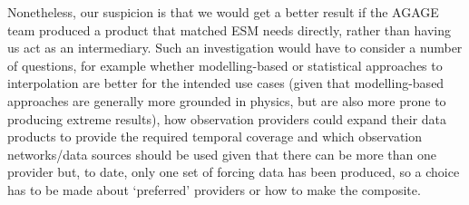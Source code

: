 Nonetheless, our suspicion is that we would get a better result if the AGAGE team produced a product that matched ESM needs directly,
rather than having us act as an intermediary.
Such an investigation would have to consider a number of questions,
for example whether modelling-based or statistical approaches to interpolation are better for the intended use cases
(given that modelling-based approaches are generally more grounded in physics, but are also more prone to producing extreme results),
how observation providers could expand their data products to provide the required temporal coverage
and which observation networks/data sources should be used given that there can be more than one provider
but, to date, only one set of forcing data has been produced,
so a choice has to be made about `preferred' providers or how to make the composite.

